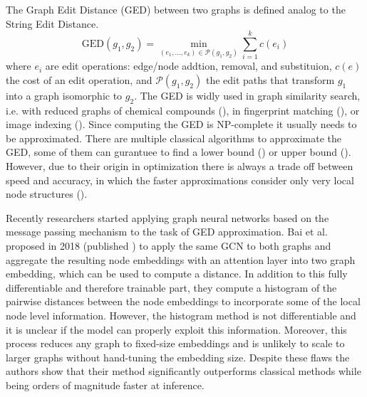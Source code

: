 The Graph Edit Distance (GED) between two graphs is defined analog to the String Edit Distance.
\begin{equation}
     \text{GED}(g_{1},g_{2}) = \min_{(e_{1},...,e_{k}) \in \mathcal{P}(g_{1},g_{2})} \sum_{i=1}^{k} c(e_{i})
\end{equation}
where $e_{i}$ are edit operations: edge/node addtion, removal, and substituion, $c(e)$ the cost of an edit operation, and $\mathcal{P}(g_{1},g_{2})$ the edit paths that transform $g_{1}$ into a graph isomorphic to $g_{2}$. The GED is widly used in graph similarity search, i.e. with reduced graphs of chemical compounds (\citealp{chem2006}), in fingerprint matching (\citealp{fingerprint2005}), or image indexing (\citealp{image_index2008}). Since computing the GED is NP-complete \cite{np_complete1998} it usually needs to be approximated. There are multiple classical algorithms to approximate the GED, some of them can gurantuee to find a lower bound (\cite{hungarian2009}) or upper bound (\citealp{hed2015}). However, due to their origin in optimization there is always a trade off between speed and accuracy, in which the faster approximations consider only very local node structures (\citealp{riba2018}).



Recently researchers started applying graph neural networks based on the message passing mechanism to the task of GED approximation. Bai et al. proposed in 2018 (published \citealp{bai2019}) to apply the same GCN to both graphs and aggregate the resulting node embeddings with an attention layer into two graph embedding, which can be used to compute a distance. In addition to this fully differentiable and therefore trainable part, they compute a histogram of the pairwise distances between the node embeddings to incorporate some of the local node level information. However, the histogram method is not differentiable and it is unclear if the model can properly exploit this information. Moreover, this process reduces any graph to fixed-size embeddings and is unlikely to scale to larger graphs without hand-tuning the embedding size. Despite these flaws the authors show that their method significantly outperforms classical methods while being orders of magnitude faster at inference.

